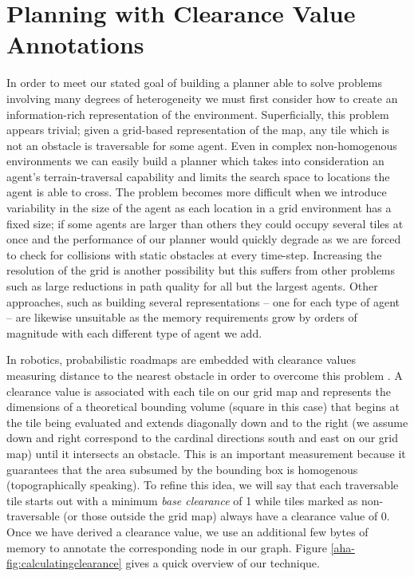 \section{Planning with Clearance Value Annotations}
\label{aha:annotations}
In order to meet our stated goal of building a planner able to solve problems involving many degrees of heterogeneity we must first consider how to create an information-rich representation of the environment. Superficially, this problem appears trivial; given a grid-based representation of the map, any tile which is not an obstacle is traversable for some agent. Even in complex non-homogenous environments we can easily build a planner which takes into consideration an agent's terrain-traversal capability and limits the search space to locations the agent is able to cross.
The problem becomes more difficult when we introduce variability in the size of the agent as each location in a grid environment has a fixed size; if some agents are larger than others they could occupy several tiles at once and the performance of our planner would quickly degrade as we are forced to check for collisions with static obstacles at every time-step. Increasing the resolution of the grid is another possibility but this suffers from other problems such as large reductions in path quality for all but the largest agents. Other approaches, such as building several representations -- one for each type of agent -- are likewise unsuitable as the memory requirements grow by orders of magnitude with each different type of agent we add. \\ \newline

In robotics, probabilistic roadmaps are embedded with clearance values measuring distance to the nearest obstacle in order to overcome this problem \cite{geraerts04}. 
A clearance value is associated with each tile on our grid map and represents the dimensions of a theoretical bounding volume (square in this case) that begins at the tile being evaluated and extends diagonally down and to the right (we assume down and right correspond to the cardinal directions south and east on our grid map) until it intersects an obstacle. This is an important measurement because it guarantees that the area subsumed by the bounding box is homogenous (topographically speaking).
To refine this idea, we will say that each traversable tile starts out with a minimum \emph{base clearance} of 1 while tiles marked as non-traversable (or those outside the grid map) always have a clearance value of 0. Once we have derived a clearance value, we use an additional few bytes of memory to annotate the corresponding node in our graph. Figure \ref{aha-fig:calculatingclearance} gives a quick overview of our technique.

